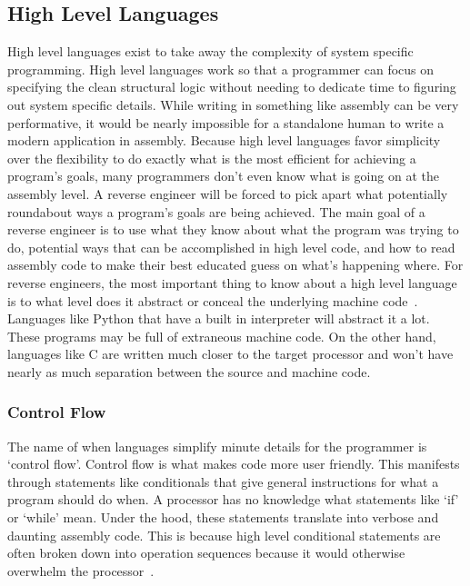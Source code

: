 \documentclass[12pt]{article}
\begin{document}
\subsection{High Level Languages}
High level languages exist to take away the complexity of system specific programming. High level languages work so that a programmer can focus on specifying the clean structural logic without needing to dedicate time to figuring out system specific details. While writing in something like assembly can be very performative, it would be nearly impossible for a standalone human to write a modern application in assembly.
Because high level languages favor simplicity over the flexibility to do exactly what is the most efficient for achieving a program’s goals, many programmers don’t even know what is going on at the assembly level. A reverse engineer will be forced to pick apart what potentially roundabout ways a program’s goals are being achieved. The main goal of a reverse engineer is to use what they know about what the program was trying to do, potential ways that can be accomplished in high level code, and how to read assembly code to make their best educated guess on what’s happening where.
For reverse engineers, the most important thing to know about a high level language is to what level does it abstract or conceal the underlying machine code~\cite{Reversing}. Languages like Python that have a built in interpreter will abstract it a lot. These programs may be full of extraneous machine code. On the other hand, languages like C are written much closer to the target processor and won’t have nearly as much separation between the source and machine code.

\subsubsection{Control Flow}
The name of when languages simplify minute details for the programmer is ‘control flow’. Control flow is what makes code more user friendly. This manifests through statements like conditionals that give general instructions for what a program should do when. A processor has no knowledge what statements like ‘if’ or ‘while’ mean. Under the hood, these statements translate into verbose and daunting assembly code. This is because high level conditional statements are often broken down into operation sequences because it would otherwise overwhelm the processor~\cite{Reversing}.
\end{document}
